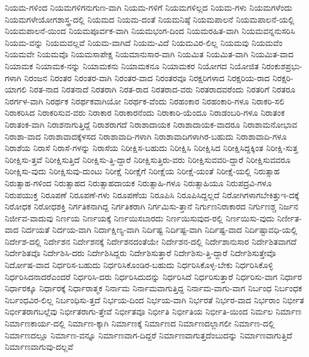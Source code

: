 {ನಿಯಮ-ಗಳಿಂದ
ನಿಯಮಗಳಿಗನುಗುಣ-ವಾಗಿ
ನಿಯಮ-ಗಳಿಗೆ
ನಿಯಮಗಳಿಲ್ಲದ
ನಿಯಮ-ಗಳು
ನಿಯಮಗಳೆಂದು
ನಿಯಮಗಳೇಯೋಗಶಾಸ್ತ್ರ-ದಲ್ಲಿ
ನಿಯಮದ
ನಿಯಮ-ದಂತೆ
ನಿಯಮನಿಷ್ಠೆ
ನಿಯಮಪಾಲನೆ
ನಿಯಮಪಾಲನೆ-ಯಲ್ಲಿ
ನಿಯಮಪಾಲನೆ-ಯಿಂದ
ನಿಯಮಪೂರ್ವಕ-ವಾಗಿ
ನಿಯಮಭಂಗ-ದಿಂದ
ನಿಯಮರಹಿತ-ವಾಗಿ
ನಿಯಮವನ್ನನುಸರಿಸಿ
ನಿಯಮ-ವನ್ನು
ನಿಯಮವಲ್ಲವೆ
ನಿಯಮ-ವಾಗಿದೆ
ನಿಯಮ-ವಿದೆ
ನಿಯಮವಿರ-ಲಿಲ್ಲ
ನಿಯಮವು
ನಿಯಮವೆಂ
ನಿಯಮವೇ
ನಿಯಮವೊ
ನಿಯಮಸಾಪೇಕ್ಷ
ನಿಯಮಾನುಸಾರ-ವಾಗಿ
ನಿಯಮಿತ
ನಿಯಮಿತ-ವಾಗಿ
ನಿಯಮಿತ-ವಾದ
ನಿಯಾಮಕ
ನಿಯಾಮಕ-ನನ್ನು
ನಿಯಾಮಕನು
ನಿಯಾಮಕನೂ
ನಿಯಾಮಕರ
ನಿಯೋಗದ
ನಿಯೋಜಿತ
ನಿರಂಕುಶಪ್ರಭು-ಗಳಾಗಿ
ನಿರಂಜನ
ನಿರಂತರ
ನಿರಂತರ-ವಾಗಿ
ನಿರಂತರ-ವಾದ
ನಿರಂತರವೂ
ನಿರಕ್ಷರಿಗಳಾದ
ನಿರಕ್ಷರಿಯ-ರಾದ
ನಿರಕ್ಷರಿ-ಯಾಗಲಿ
ನಿರತ-ನಾದ
ನಿರತನಾದೆ
ನಿರತರಾಗಿ
ನಿರತ-ರಾದ
ನಿರತರಾದ-ವರು
ನಿರತರಾದವರೆಂದು
ನಿರತರಿಗೆ
ನಿರತರೂ
ನಿರರ್ಗಳ-ವಾಗಿ
ನಿರರ್ಥಕ
ನಿರರ್ಥಕವಾಗಿಯೋ
ನಿರರ್ಥಕ-ವೆಂದು
ನಿರಹಂಕಾರ
ನಿರಹಂಕಾರಿ-ಗಳೂ
ನಿರಾಕರಿ-ಸಲಿ
ನಿರಾಕರಿಸಿದ
ನಿರಾಕರಿಸುವ-ವರು
ನಿರಾಕಾರ
ನಿರಾಕಾರನೆಂದು
ನಿರಾಕಾರಿ-ಯೆಂದೂ
ನಿರಾಡಂಬರಿ-ಗಳೂ
ನಿರಾತಂಕ
ನಿರಾತಂಕ-ವಾಗಿ
ನಿರಾಶನಾಗುತ್ತಿದ್ದೆ
ನಿರಾಶರಾಗದೆ
ನಿರಾಶಾದಾಯಕ
ನಿರಾಶಾದಾಯಕ-ವಾದರೂ
ನಿರಾಶಾಮನೋಭಾವ
ನಿರಾಶಾ-ವಾದ
ನಿರಾಶಾವಾದಕ್ಕೆಳಸದ
ನಿರಾಶಾವಾದಿ-ಗಳಾಗಿ
ನಿರಾಶಾವಾದಿಗಳಾಗಿರ-ಬಹುದು
ನಿರಾಶಾವಾದಿ-ಗಳೂ
ನಿರಾಶೆಯ
ನಿರಾಸೆ
ನಿರಾಸೆ-ಗಳನ್ನು
ನಿರಾಸೆಯ
ನಿರೀಕ್ಷಿಸ-ಬಹುದು
ನಿರೀಕ್ಷಿಸಿ
ನಿರೀಕ್ಷಿಸಿದ
ನಿರೀಕ್ಷಿಸಿದ್ದಕ್ಕಿಂತ
ನಿರೀಕ್ಷಿ-ಸುತ್ತ
ನಿರೀಕ್ಷಿಸು-ತ್ತವೆ
ನಿರೀಕ್ಷಿಸುತ್ತಿದೆ
ನಿರೀಕ್ಷಿಸು-ತ್ತಿ-ದ್ದಾರೆ
ನಿರೀಕ್ಷಿಸುತ್ತಿರು-ವರು
ನಿರೀಕ್ಷಿಸುವವರಿ-ದ್ದಾರೆ
ನಿರೀಕ್ಷಿಸುವವರೂ
ನಿರೀಕ್ಷಿಸು-ವುದು
ನಿರೀಕ್ಷಿಸುವು-ದುಂಟು
ನಿರೀಕ್ಷೆ
ನಿರೀಕ್ಷೆಗೆ
ನಿರೀಕ್ಷೆಯ
ನಿರೀಕ್ಷೆ-ಯಂತೆ
ನಿರೀಕ್ಷೆ-ಯಲ್ಲಿ
ನಿರುತ್ಸಾಹ
ನಿರುತ್ಸಾಹ-ಗಳಿಂದ
ನಿರುತ್ಸಾಹದ
ನಿರುತ್ಸಾಹದಾಯಕ
ನಿರುತ್ಸಾಹಿ-ಗಳೂ
ನಿರುತ್ಸಾಹಿಯೂ
ನಿರುಪದ್ರವಿ-ಗಳೂ
ನಿರುಪಯುಕ್ತ
ನಿರೂಪಣೆ
ನಿರೂಪಣೆ-ಗಳು
ನಿರೂಪಣೆಯ
ನಿರೂಪಿಸಿ
ನಿರೂಪಿಸಿದ್ದಲ್ಲದೆ
ನಿರೋಗಿಗಳಾಗಬೇಕಿತ್ತುಇ-ದಕ್ಕೆ
ನಿರೋಧಕ
ನಿರೋಧಶಕ್ತಿ
ನಿರ್ಗತಿಕನಾಗಿದ್ದ
ನಿರ್ಗತಿಕರಾಗಿ
ನಿರ್ಗಮಿಸು-ತ್ತಾನೆ
ನಿರ್ಗುಣನಿರಾಕಾರದ
ನಿರ್ಗುಣಶ್ಚ
ನಿರ್ಜನ
ನಿರ್ಜೀವ-ವಾದುವು
ನಿರ್ಣಯ
ನಿರ್ಣಯಕ್ಕೆ
ನಿರ್ಣಯಿಸಬಾರದು
ನಿರ್ಣಯಿಸುವುದ-ರಲ್ಲಿ
ನಿರ್ಣಯಿಸು-ವುದು
ನಿರ್ಣೀತ-ವಾದ
ನಿರ್ದಯತೆ
ನಿರ್ದಯ-ವಾಗಿ
ನಿರ್ದಾಕ್ಷಿಣ್ಯ-ವಾಗಿ
ನಿರ್ದಿಷ್ಟ
ನಿರ್ದಿಷ್ಟ-ವಾಗಿ
ನಿರ್ದಿಷ್ಟ-ವಾದ
ನಿರ್ದಿಷ್ಟಾವಧಿ-ಯಲ್ಲಿ
ನಿರ್ದೇಶ-ದಲ್ಲಿ
ನಿರ್ದೇಶನ
ನಿರ್ದೇಶನಕ್ಕೆ
ನಿರ್ದೇಶನದಂತೆಯೇ
ನಿರ್ದೇಶನ-ದಲ್ಲಿ
ನಿರ್ದೇಶಾನುಸಾರ
ನಿರ್ದೇಶಿತವಾಗದೆ
ನಿರ್ದೇಶಿತವೊ
ನಿರ್ದೇಶಿಸಿ-ದರು
ನಿರ್ದೇಶಿಸಿದ್ದರು
ನಿರ್ದೇಶಿಸುತ್ತಾರೆ
ನಿರ್ದೇಶಿಸು-ತ್ತಿ-ದ್ದಾರೆ
ನಿರ್ದೇಶಿಸುತ್ತೇವೊ
ನಿರ್ದೋಷ-ವಾದ
ನಿರ್ಧರಿಸ-ಬಹುದು
ನಿರ್ಧರಿಸಿಕೊಂಡಿರ-ಬಹುದು
ನಿರ್ಧರಿಸಿಕೊಳ್ಳ-ಬೇಕು
ನಿರ್ಧರಿಸಿಕೊಳ್ಳಿ
ನಿರ್ಧರಿಸಿದನಾದರೆಎಂದರೆ
ನಿರ್ಧರಿಸಿ-ದರು
ನಿರ್ಧರಿಸಿದುದನ್ನು
ನಿರ್ಧರಿಸಿದೆ
ನಿರ್ಧರಿಸುತ್ತಾರೆ
ನಿರ್ಧರಿಸು-ವಾಗ
ನಿರ್ಧಾರ
ನಿರ್ಧಾರಕ್ಕೂ
ನಿರ್ಧಾರಕ್ಕೆ
ನಿರ್ಧಾರಾತ್ಮಕ
ನಿರ್ನಾಮ
ನಿರ್ನಾಮವಾಗುತ್ತಿದ್ದ
ನಿರ್ನಾಮ-ವಾಗು-ವಾಗ
ನಿರ್ಬಂಧ
ನಿರ್ಬಂಧಕ
ನಿರ್ಬಂಧವಿರ-ಲಿಲ್ಲ
ನಿರ್ಬಂಧಿಸು-ತ್ತದೆ
ನಿರ್ಭಯ-ದಿಂದ
ನಿರ್ಭಯ-ವಾಗಿ
ನಿರ್ಭರತೆ
ನಿರ್ಭರ-ವಾದ
ನಿರ್ಭರಾಂ
ನಿರ್ಭೀತ
ನಿರ್ಭೀತರಾಗಬಲ್ಲೆವು
ನಿರ್ಭೀತರಾಗು-ತ್ತೇವೆ
ನಿರ್ಭೀತವೂ
ನಿರ್ಭೀತಿ
ನಿರ್ಭೀತಿಯ
ನಿರ್ಭೀತಿ-ಯಿಂದ
ನಿರ್ಮಲ
ನಿರ್ಮಾಣ
ನಿರ್ಮಾಣಕಾರ್ಯ-ದಲ್ಲಿ
ನಿರ್ಮಾಣ-ಕ್ಕಾಗಿ
ನಿರ್ಮಾಣಕ್ಕೆ
ನಿರ್ಮಾಣದ
ನಿರ್ಮಾಣದಲ್ಲಾಗಲೀ
ನಿರ್ಮಾಣ-ದಲ್ಲಿ
ನಿರ್ಮಾಣದಲ್ಲೂ
ನಿರ್ಮಾಣ-ವನ್ನೂ
ನಿರ್ಮಾಣವಾಗ-ದಿದ್ದರೆ
ನಿರ್ಮಾಣವಾಗುತ್ತದೆಂಬುದನ್ನು
ನಿರ್ಮಾಣವಾಗುತ್ತಿದೆ
ನಿರ್ಮಾಣವಾಗುವು-ದಲ್ಲವೆ
}
